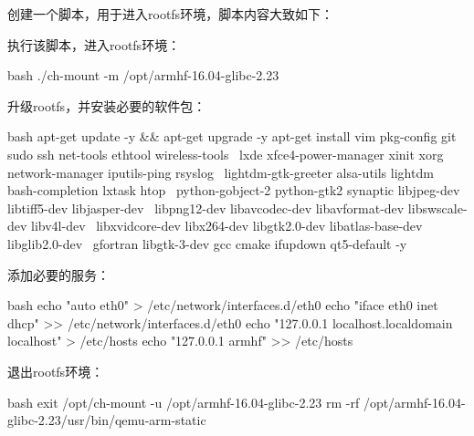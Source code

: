 创建一个脚本，用于进入rootfs环境，脚本内容大致如下：

执行该脚本，进入rootfs环境：
\begin{code-block}{bash}
./ch-mount -m /opt/armhf-16.04-glibc-2.23
\end{code-block}

升级rootfs，并安装必要的软件包：
\begin{code-block}{bash}
apt-get update -y && apt-get upgrade -y
apt-get install vim pkg-config git sudo ssh net-tools ethtool wireless-tools \
    lxde xfce4-power-manager xinit xorg network-manager iputils-ping rsyslog \
    lightdm-gtk-greeter alsa-utils lightdm bash-completion lxtask htop \
    python-gobject-2 python-gtk2 synaptic libjpeg-dev libtiff5-dev libjasper-dev \
    libpng12-dev libavcodec-dev libavformat-dev libswscale-dev libv4l-dev \
    libxvidcore-dev libx264-dev libgtk2.0-dev libatlas-base-dev libglib2.0-dev \
    gfortran libgtk-3-dev gcc cmake ifupdown qt5-default -y
\end{code-block}

添加必要的服务：
\begin{code-block}{bash}
echo "auto eth0" > /etc/network/interfaces.d/eth0
echo "iface eth0 inet dhcp" >> /etc/network/interfaces.d/eth0
echo "127.0.0.1    localhost.localdomain localhost" > /etc/hosts
echo "127.0.0.1    armhf" >> /etc/hosts
\end{code-block}

退出rootfs环境：
\begin{code-block}{bash}
exit
/opt/ch-mount -u /opt/armhf-16.04-glibc-2.23
rm -rf /opt/armhf-16.04-glibc-2.23/usr/bin/qemu-arm-static
\end{code-block}

